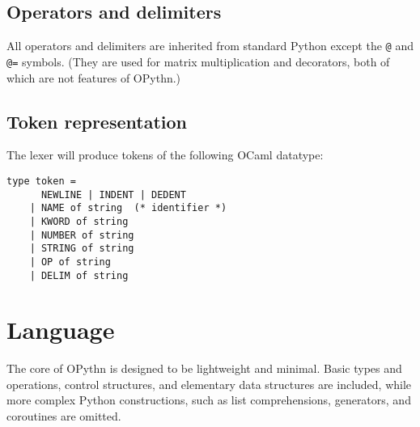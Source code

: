 \documentclass[11pt, twoside]{article}
\newcommand{\ms}{\texttt}
\begin{document}
    \subsection{Operators and delimiters}
    All operators and delimiters are inherited from standard Python except the \ms{@} and \ms{@=} symbols. (They are used for matrix multiplication and decorators, both of which are not features of OPythn.)
    \subsection{Token representation}
    The lexer will produce tokens of the following OCaml datatype:
    \begin{lstlisting}[language=caml]
    type token =
      NEWLINE | INDENT | DEDENT
    | NAME of string  (* identifier *)
    | KWORD of string
    | NUMBER of string
    | STRING of string
    | OP of string
    | DELIM of string
    \end{lstlisting}

\section{Language}
    The core of OPythn is designed to be lightweight and minimal. Basic types and operations, control structures, and elementary data structures are included, while more complex Python constructions, such as list comprehensions, generators, and coroutines are omitted.
\end{document}
